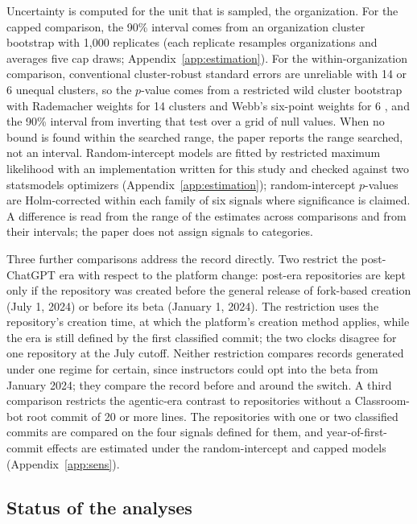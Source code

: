 \documentclass[acmsmall,screen,review,anonymous]{acmart}
\begin{document}
Uncertainty is computed for the unit that is sampled, the organization. For the capped comparison, the 90\% interval comes from an organization cluster bootstrap with 1,000 replicates (each replicate resamples organizations and averages five cap draws; Appendix~\ref{app:estimation}). For the within-organization comparison, conventional cluster-robust standard errors are unreliable with 14 or 6 unequal clusters, so the $p$-value comes from a restricted wild cluster bootstrap \citep{roodman2019boottest} with Rademacher weights for 14 clusters and Webb's six-point weights for 6 \citep{webb2023reworking}, and the 90\% interval from inverting that test over a grid of null values. When no bound is found within the searched range, the paper reports the range searched, not an interval. Random-intercept models are fitted by restricted maximum likelihood with an implementation written for this study and checked against two statsmodels optimizers (Appendix~\ref{app:estimation}); random-intercept $p$-values are Holm-corrected within each family of six signals where significance is claimed. A difference is read from the range of the estimates across comparisons and from their intervals; the paper does not assign signals to categories.

Three further comparisons address the record directly. Two restrict the post-ChatGPT era with respect to the platform change: post-era repositories are kept only if the repository was created before the general release of fork-based creation (July 1, 2024) or before its beta (January 1, 2024). The restriction uses the repository's creation time, at which the platform's creation method applies, while the era is still defined by the first classified commit; the two clocks disagree for one repository at the July cutoff. Neither restriction compares records generated under one regime for certain, since instructors could opt into the beta from January 2024; they compare the record before and around the switch. A third comparison restricts the agentic-era contrast to repositories without a Classroom-bot root commit of 20 or more lines. The repositories with one or two classified commits are compared on the four signals defined for them, and year-of-first-commit effects are estimated under the random-intercept and capped models (Appendix~\ref{app:sens}).

\subsection{Status of the analyses}
\label{sec:status}
\end{document}
